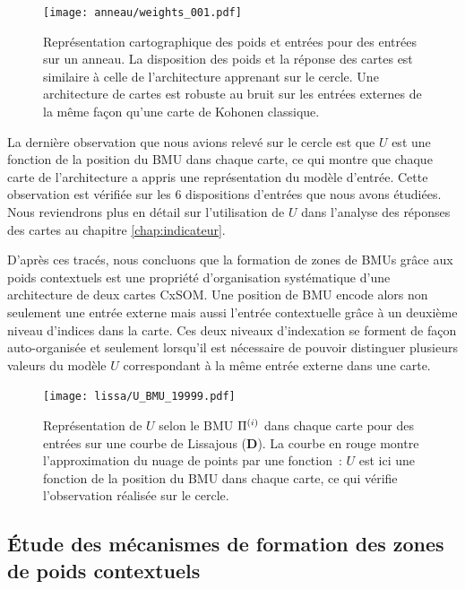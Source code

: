 \documentclass[../main]{subfiles}
\begin{document}
\begin{figure}[H]
	\centering\texttt{[image: anneau/weights\_001.pdf]}
	\caption{Représentation cartographique des poids et entrées pour des entrées sur un anneau. La disposition des poids et la réponse des cartes est similaire à celle de l'architecture apprenant sur le cercle. Une architecture de cartes est robuste au bruit sur les entrées externes de la même façon qu'une carte de Kohonen classique. \label{fig:anneau_w}}
\end{figure}



La dernière observation que nous avions relevé sur le cercle est que $U$ est une fonction de la position du BMU dans chaque carte, ce qui montre que chaque carte de l'architecture a appris une représentation du modèle d'entrée.
Cette observation est vérifiée sur les 6 dispositions d'entrées que nous avons étudiées.
Nous reviendrons plus en détail sur l'utilisation de $U$ dans l'analyse des réponses des cartes au chapitre \ref{chap:indicateur}.

D'après ces tracés, nous concluons que la formation de zones de BMUs grâce aux poids contextuels est une propriété d'organisation systématique d'une architecture de deux cartes CxSOM. Une position de BMU encode alors non seulement une entrée externe mais aussi l'entrée contextuelle grâce à un deuxième niveau d'indices dans la carte. Ces deux niveaux d'indexation se forment de façon auto-organisée et seulement lorsqu'il est nécessaire de pouvoir distinguer plusieurs valeurs du modèle $U$ correspondant à la même entrée externe dans une carte.

\begin{figure}[t]
	\centering\texttt{[image: lissa/U\_BMU\_19999.pdf]}
	\caption{Représentation de $U$ selon le BMU $\Pi^{({i})}$ dans chaque carte pour des entrées sur une courbe de Lissajous (\textbf{D}). La courbe en rouge montre l'approximation du nuage de points par une fonction~: $U$ est ici une fonction de la position du BMU dans chaque carte, ce qui vérifie l'observation réalisée sur le cercle.}
\end{figure}

\subsection{\'Etude des mécanismes de formation des zones de poids contextuels}
\end{document}

